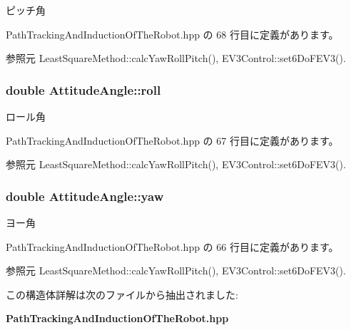 ピッチ角 



 Path\-Tracking\-And\-Induction\-Of\-The\-Robot.\-hpp の 68 行目に定義があります。



参照元 Least\-Square\-Method\-::calc\-Yaw\-Roll\-Pitch(), E\-V3\-Control\-::set6\-Do\-F\-E\-V3().

\subsubsection[{roll}]{\setlength{\rightskip}{0pt plus 5cm}double Attitude\-Angle\-::roll}\label{struct_attitude_angle_ae41ffc4738b93a5ce00141fb8b535c74}


ロール角 



 Path\-Tracking\-And\-Induction\-Of\-The\-Robot.\-hpp の 67 行目に定義があります。



参照元 Least\-Square\-Method\-::calc\-Yaw\-Roll\-Pitch(), E\-V3\-Control\-::set6\-Do\-F\-E\-V3().

\subsubsection[{yaw}]{\setlength{\rightskip}{0pt plus 5cm}double Attitude\-Angle\-::yaw}\label{struct_attitude_angle_a9a2b52b89e0f763cef36b623962ff998}


ヨー角 



 Path\-Tracking\-And\-Induction\-Of\-The\-Robot.\-hpp の 66 行目に定義があります。



参照元 Least\-Square\-Method\-::calc\-Yaw\-Roll\-Pitch(), E\-V3\-Control\-::set6\-Do\-F\-E\-V3().



この構造体詳解は次のファイルから抽出されました\-:\begin{DoxyCompactItemize}
\item 
{\bf Path\-Tracking\-And\-Induction\-Of\-The\-Robot.\-hpp}\end{DoxyCompactItemize}
